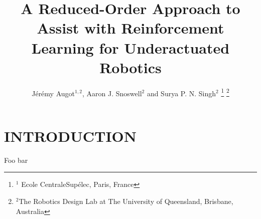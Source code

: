 \documentclass[letterpaper, 10 pt, conference]{ieeeconf}
\title{
    \LARGE \bf%
    A Reduced-Order Approach to Assist with Reinforcement Learning for Underactuated Robotics
}
\author{
    J\'er\'emy Augot$^{1,2}$, Aaron J. Snoswell$^{2}$ and Surya P. N. Singh$^{2}$
    \thanks{
        $^{1}$ Ecole CentraleSup\'elec, Paris, France
    }%
    \thanks{
        $^{2}$The Robotics Design Lab at The University of Queensland, Brisbane, Australia
    }%
}
\begin{document}
\maketitle
\thispagestyle{empty}
\pagestyle{empty}

\begin{abstract}

\lipsum[1]

\end{abstract}

\section{INTRODUCTION}

Foo bar \cite{Haarnoja2018SAC}

\lipsum[1-2]
\end{document}
